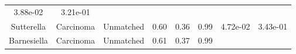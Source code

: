 \documentclass[12pt,]{article}
\begin{document}
\begin{longtable}[]{@{}cccccccc@{}}
\begin{minipage}[t]{0.06\columnwidth}
3.88e-02\strut
\end{minipage} & \begin{minipage}[t]{0.06\columnwidth}\centering\strut
3.21e-01\strut
\end{minipage}\tabularnewline
\begin{minipage}[t]{0.19\columnwidth}\centering\strut
Sutterella\strut
\end{minipage} & \begin{minipage}[t]{0.07\columnwidth}\centering\strut
Carcinoma\strut
\end{minipage} & \begin{minipage}[t]{0.09\columnwidth}\centering\strut
Unmatched\strut
\end{minipage} & \begin{minipage}[t]{0.03\columnwidth}\centering\strut
0.60\strut
\end{minipage} & \begin{minipage}[t]{0.14\columnwidth}\centering\strut
0.36\strut
\end{minipage} & \begin{minipage}[t]{0.14\columnwidth}\centering\strut
0.99\strut
\end{minipage} & \begin{minipage}[t]{0.06\columnwidth}\centering\strut
4.72e-02\strut
\end{minipage} & \begin{minipage}[t]{0.06\columnwidth}\centering\strut
3.43e-01\strut
\end{minipage}\tabularnewline
\begin{minipage}[t]{0.19\columnwidth}\centering\strut
Barnesiella\strut
\end{minipage} & \begin{minipage}[t]{0.07\columnwidth}\centering\strut
Carcinoma\strut
\end{minipage} & \begin{minipage}[t]{0.09\columnwidth}\centering\strut
Unmatched\strut
\end{minipage} & \begin{minipage}[t]{0.03\columnwidth}\centering\strut
0.61\strut
\end{minipage} & \begin{minipage}[t]{0.14\columnwidth}\centering\strut
0.37\strut
\end{minipage} & \begin{minipage}[t]{0.14\columnwidth}\centering\strut
0.99\strut
\end{minipage} & \begin{minipage}[t]{0.06\columnwidth}\centering\strut

\end{minipage}
\end{longtable}
\end{document}
